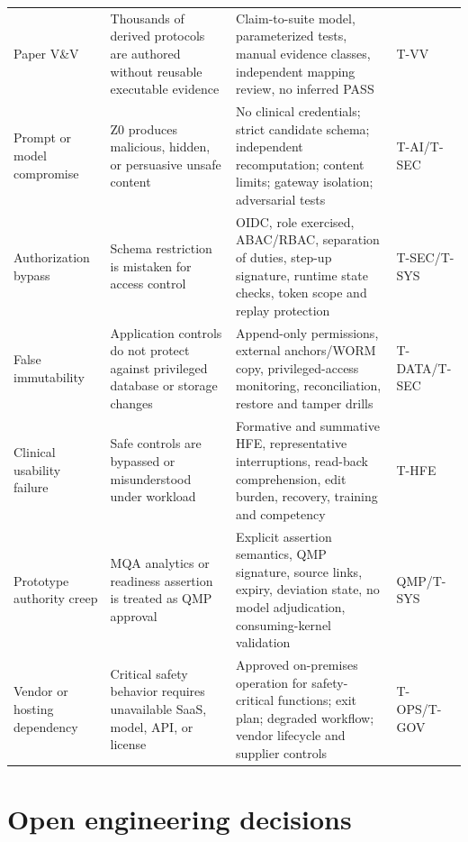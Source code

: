 \documentclass[11pt,letterpaper]{article}
\begin{document}
\begin{small}
\begin{longtable}{@{}L{0.18\textwidth}L{0.27\textwidth}L{0.35\textwidth}L{0.10\textwidth}@{}}
\addlinespace[2pt]
Paper V\&V & Thousands of derived protocols are authored without reusable executable evidence & Claim-to-suite model, parameterized tests, manual evidence classes, independent mapping review, no inferred PASS & T-VV \\
\addlinespace[2pt]
Prompt or model compromise & Z0 produces malicious, hidden, or persuasive unsafe content & No clinical credentials; strict candidate schema; independent recomputation; content limits; gateway isolation; adversarial tests & T-AI/T-SEC \\
\addlinespace[2pt]
Authorization bypass & Schema restriction is mistaken for access control & OIDC, role exercised, ABAC/RBAC, separation of duties, step-up signature, runtime state checks, token scope and replay protection & T-SEC/T-SYS \\
\addlinespace[2pt]
False immutability & Application controls do not protect against privileged database or storage changes & Append-only permissions, external anchors/WORM copy, privileged-access monitoring, reconciliation, restore and tamper drills & T-DATA/T-SEC \\
\addlinespace[2pt]
Clinical usability failure & Safe controls are bypassed or misunderstood under workload & Formative and summative HFE, representative interruptions, read-back comprehension, edit burden, recovery, training and competency & T-HFE \\
\addlinespace[2pt]
Prototype authority creep & MQA analytics or readiness assertion is treated as QMP approval & Explicit assertion semantics, QMP signature, source links, expiry, deviation state, no model adjudication, consuming-kernel validation & QMP/T-SYS \\
\addlinespace[2pt]
Vendor or hosting dependency & Critical safety behavior requires unavailable SaaS, model, API, or license & Approved on-premises operation for safety-critical functions; exit plan; degraded workflow; vendor lifecycle and supplier controls & T-OPS/T-GOV \\
\end{longtable}
\end{small}

\section{Open engineering decisions}
\end{document}
